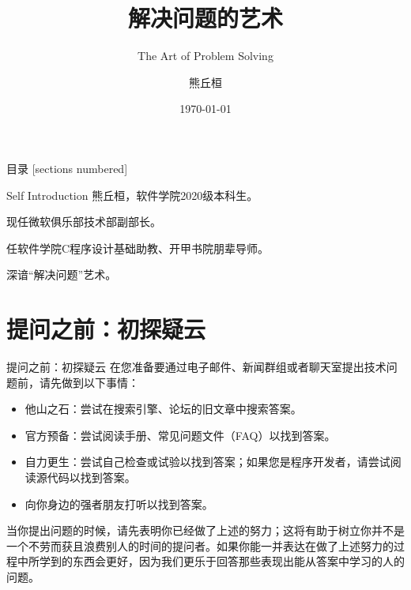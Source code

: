 \documentclass[10pt]{beamer}
\title{解决问题的艺术}
\subtitle{The Art of Problem Solving}
\date{\today}
\author{熊丘桓}
\institute{南京大学微软俱乐部}
\begin{document}
\maketitle

\begin{frame}{目录}
    [sections numbered]
    \tableofcontents[hideallsubsections]
\end{frame}


\begin{frame}[fragile]{Self Introduction}
    熊丘桓，软件学院2020级本科生。

    现任微软俱乐部技术部副部长。

    任软件学院C程序设计基础助教、开甲书院朋辈导师。

    深谙“解决问题”艺术。
\end{frame}

\section{提问之前：初探疑云}

\begin{frame}[fragile]{提问之前：初探疑云}
    在您准备要通过电子邮件、新闻群组或者聊天室提出技术问题前，请先做到以下事情：
    \begin{itemize}
        \item 他山之石：尝试在搜索引擎、论坛的旧文章中搜索答案。
        \item 官方预备：尝试阅读手册、常见问题文件（FAQ）以找到答案。
        \item 自力更生：尝试自己检查或试验以找到答案；如果您是程序开发者，请尝试阅读源代码以找到答案。
        \item 向你身边的强者朋友打听以找到答案。
    \end{itemize}

    当你提出问题的时候，请先表明你已经做了上述的努力；这将有助于树立你并不是一个不劳而获且浪费别人的时间的提问者。如果你能一并表达在做了上述努力的过程中所学到的东西会更好，因为我们更乐于回答那些表现出能从答案中学习的人的问题。
\end{frame}
\end{document}
